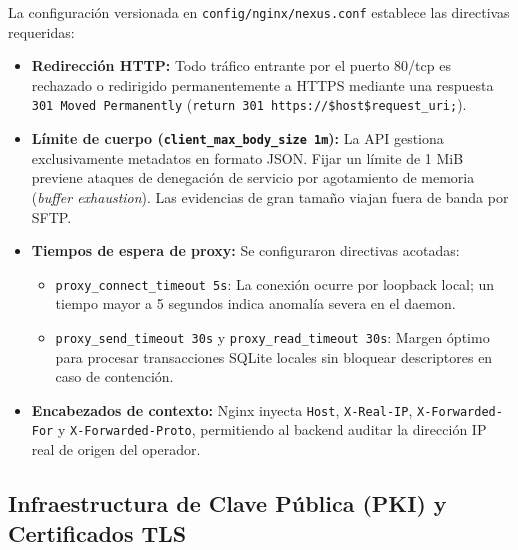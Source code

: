 \documentclass[10pt,a4paper]{article}
\begin{document}
La configuración versionada en \texttt{config/nginx/nexus.conf} establece las directivas requeridas:
\begin{itemize}[leftmargin=*]
    \item \textbf{Redirección HTTP:} Todo tráfico entrante por el puerto 80/tcp es rechazado o redirigido permanentemente a HTTPS mediante una respuesta \texttt{301 Moved Permanently} (\texttt{return 301 https://\$host\$request\_uri;}).
    \item \textbf{Límite de cuerpo (\texttt{client\_max\_body\_size 1m}):} La API gestiona exclusivamente metadatos en formato JSON. Fijar un límite de 1 MiB previene ataques de denegación de servicio por agotamiento de memoria (\textit{buffer exhaustion}). Las evidencias de gran tamaño viajan fuera de banda por SFTP.
    \item \textbf{Tiempos de espera de proxy:} Se configuraron directivas acotadas:
    \begin{itemize}
        \item \texttt{proxy\_connect\_timeout 5s}: La conexión ocurre por loopback local; un tiempo mayor a 5 segundos indica anomalía severa en el daemon.
        \item \texttt{proxy\_send\_timeout 30s} y \texttt{proxy\_read\_timeout 30s}: Margen óptimo para procesar transacciones SQLite locales sin bloquear descriptores en caso de contención.
    \end{itemize}
    \item \textbf{Encabezados de contexto:} Nginx inyecta \texttt{Host}, \texttt{X-Real-IP}, \texttt{X-Forwarded-For} y \texttt{X-Forwarded-Proto}, permitiendo al backend auditar la dirección IP real de origen del operador.
\end{itemize}

\subsection{Infraestructura de Clave Pública (PKI) y Certificados TLS}
\end{document}
